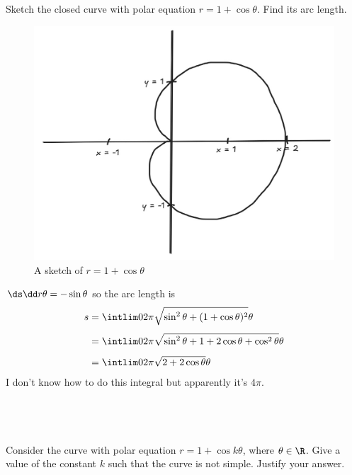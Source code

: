 \documentclass[a4paper]{article}
\begin{document}
\subsection{~} %

\begin{questionbody}
Sketch the closed curve with polar equation $r = 1 + \cos \theta$. Find its arc length.
\end{questionbody}

\begin{figure}[h]
	\centering
	\includegraphics[scale=0.3]{Q1b}
	\caption{A sketch of $r = 1 + \cos\theta$}
\end{figure}

$\ds\dd r\theta = -\sin\theta$ so the arc length is \begin{align*}
s &= \intlim 0{2\pi} {\sqrt{\sin^2 \theta + (1 + \cos\theta)^2}} \theta\\[1ex]
&= \intlim 0{2\pi} {\sqrt{\sin^2 \theta + 1 + 2\cos\theta + \cos^2 \theta}} \theta\\[1ex]
&= \intlim 0{2\pi} {\sqrt{2 + 2\cos\theta}} \theta
\end{align*}
I don't know how to do this integral but apparently it's $4\pi$.

\newpage
\subsection{~} %

\begin{questionbody}
Consider the curve with polar equation $r = 1 + \cos k \theta$, where $\theta \in \R$. Give a value of the constant $k$ such that the curve is not simple. Justify your answer.
\end{questionbody}
\end{document}
